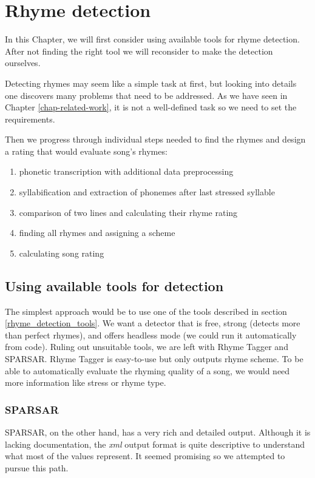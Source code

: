 
\chapter{Rhyme detection}\label{chap-rhyme-analysis}
In this Chapter, we will first consider using available tools for rhyme detection. After not finding the right tool we will reconsider to make the detection ourselves.

Detecting rhymes may seem like a simple task at first, but looking into details one discovers many problems that need to be addressed. As we have seen in Chapter \ref{chap-related-work}, it is not a well-defined task so we need to set the requirements.

Then we progress through individual steps needed to find the rhymes and design a rating that would evaluate song's rhymes:


\begin{enumerate}
	\item phonetic transcription with additional data preprocessing
	\item syllabification and extraction of phonemes after last stressed syllable
	\item comparison of two lines and calculating their rhyme rating
	\item finding all rhymes and assigning a scheme
	\item calculating song rating
\end{enumerate}

\section{Using available tools for detection}
The simplest approach would be to use one of the tools described in section \ref{rhyme_detection_tools}. We want a detector that is free, strong (detects more than perfect rhymes), and offers headless mode (we could run it automatically from code). Ruling out unsuitable tools, we are left with Rhyme Tagger and SPARSAR. Rhyme Tagger is easy-to-use but only outputs rhyme scheme. To be able to automatically evaluate the rhyming quality of a song, we would need more information like stress or rhyme type.

\subsection*{SPARSAR}
SPARSAR, on the other hand, has a very rich and detailed output. Although it is lacking documentation, the \textit{xml} output format is quite descriptive to understand what most of the values represent. It seemed promising so we attempted to pursue this path.


